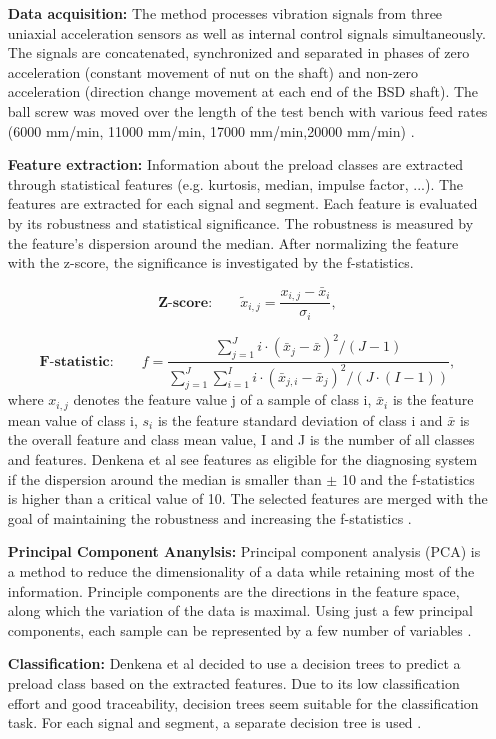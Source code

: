 \begin{itemize}
    \item [\textbf{Data acquisition:}] The method processes vibration signals from three uniaxial acceleration sensors as well as internal control signals simultaneously. The signals are concatenated, synchronized and separated in phases of zero acceleration (constant movement of nut on the shaft) and non-zero acceleration (direction change movement at each end of the BSD shaft). The ball screw was moved over the length of the test bench with various feed rates (6000 mm/min, 11000 mm/min, 17000 mm/min,20000 mm/min) \cite{Denkena2021}.
    \item [\textbf{Feature extraction:}] Information about the preload classes are extracted through statistical features (e.g. kurtosis, median, impulse factor, ...). The features are extracted for each signal and segment. Each feature is evaluated by its robustness and statistical significance. The robustness is measured by the feature's dispersion around the median. After normalizing the feature with the z-score, the significance is investigated by the f-statistics.
    
    \begin{equation}
        \textbf{Z-score:}\qquad \tilde{x}_{i,j} = \frac{x_{i,j} - \bar x_{i}}{\sigma_{i}},
    \end{equation}
    
    \begin{equation}
        \textbf{F-statistic:}\qquad f = \frac{\sum_{j=1}^{J} i \cdot (\bar x_{j} -\bar x)^{2}/(J-1)}{\sum_{j=1}^{J} \sum_{i=1}^{I} i \cdot (\bar x_{j,i} -\bar x_{j})^{2}/(J \cdot (I-1))},
    \end{equation}
    where ${x}_{i,j}$ denotes the feature value j of a sample of class i, $\bar{x}_{i}$ is the feature mean value of class i, ${s}_{i}$ is the feature standard deviation of class i and $\bar{x}$ is the overall feature and class mean value, I and J is the number of all classes and features. Denkena et al see features as eligible for the diagnosing system if the dispersion around the median is smaller than $\pm$ 10 and the f-statistics is higher than a critical value of 10. The selected features are merged with the goal of maintaining the robustness and increasing the f-statistics  \cite{Denkena2021}. 
    
    \item [\textbf{Principal Component Ananylsis:}] 
    Principal component analysis (PCA) is a method to reduce the dimensionality of a data while retaining most of the information. Principle components are the directions in the feature space, along which the variation of the data is maximal. Using just a few principal components, each sample can be represented by a few number of variables \cite{Ringner2008}.
    
    \item [\textbf{Classification:}] Denkena et al decided to use a decision trees to predict a preload class based on the extracted features. Due to its low classification effort and good traceability, decision trees seem suitable for the classification task. For each signal and segment, a separate decision tree is used  \cite{Denkena2021}. 
\end{itemize}

